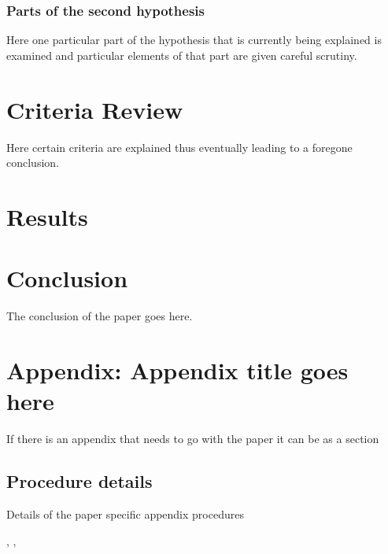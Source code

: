 \subsubsection{Parts of the second hypothesis}

Here one particular part of the hypothesis that is 
currently being explained is examined and particular
elements of that part are given careful scrutiny.

\section{Criteria Review}

Here certain criteria are explained thus eventually
leading to a foregone conclusion.

\section{Results}

\section{Conclusion}\label{conclusion3}

The conclusion of the paper goes here.





% 
%     

\section{Appendix: Appendix title goes here}
If there is an appendix that needs to go with the paper it can be as a section \cite{Aup91}

\subsection{Procedure details}
Details of the paper specific appendix procedures

\cite{Rad87}
\cite{MOR91}, \cite{Lom73} 
\cite{Lom91}, \cite{Lom92} 
\cite{dB59}